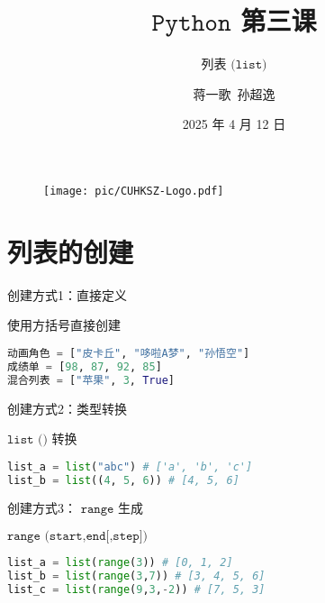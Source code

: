 \documentclass{beamer}
\title{$\texttt{Python}$ 第三课}
\subtitle{列表 $\texttt{(list)}$}
\institute{香港中文大学(深圳) \ 数据科学学院}
\date{2025 年 4 月 12 日}
\author{蒋一歌\ 孙超逸}
\begin{document}
\kaishu
\begin{frame}
    \titlepage
    \begin{figure}[htpb]
        \begin{center}
            \texttt{[image: pic/CUHKSZ-Logo.pdf]}
        \end{center}
    \end{figure}
\end{frame}



\section{列表的创建}

\begin{frame}[fragile]{创建方式1：直接定义}
\begin{exampleblock}{使用方括号直接创建}
\begin{lstlisting}[language=Python]
动画角色 = ["皮卡丘", "哆啦A梦", "孙悟空"]
成绩单 = [98, 87, 92, 85] 
混合列表 = ["苹果", 3, True]
\end{lstlisting}
\end{exampleblock}

\end{frame}

\begin{frame}[fragile]{创建方式2：类型转换}
\begin{exampleblock}{$\texttt{list ()}$ 转换}
\begin{lstlisting}[language=Python]
list_a = list("abc") # ['a', 'b', 'c']
list_b = list((4, 5, 6)) # [4, 5, 6]
\end{lstlisting}
\end{exampleblock}

\end{frame}

\begin{frame}[fragile]{创建方式3： $\texttt{range}$ 生成}
\begin{exampleblock}{$\texttt{range (start,end[,step])}$}
\begin{lstlisting}[language=Python]
list_a = list(range(3)) # [0, 1, 2]
list_b = list(range(3,7)) # [3, 4, 5, 6]
list_c = list(range(9,3,-2)) # [7, 5, 3]
\end{lstlisting}
\end{exampleblock}

\end{frame}
\end{document}
